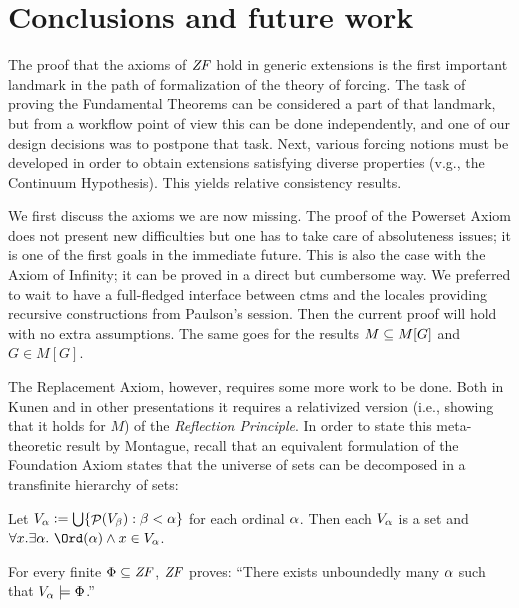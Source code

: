 \section{Conclusions and future work}
\label{sec:conclusions-future-work}

The proof that the axioms of $\mathit{ZF}$ hold in generic extensions is 
the first important landmark in the path of formalization of the
theory of forcing. The task of proving the Fundamental Theorems can be
considered a part of that landmark, but from a workflow point of view
this can be done independently, and one of our design decisions was to
postpone that task.  Next, various forcing notions must be developed
in order to obtain extensions satisfying diverse properties (v.g., the
Continuum Hypothesis). This yields relative consistency results.

We first discuss the axioms we are now missing. The proof of the
Powerset Axiom does not present new difficulties but one  has to
take care of absoluteness issues; it is one of the
first goals in the immediate future. This is also the case with the
Axiom of Infinity; it can be proved in a direct but cumbersome way. We
preferred to wait to have a full-fledged interface between ctms and the
locales providing recursive constructions from Paulson's
 session. Then the current proof will hold
with no extra assumptions. The same goes for the results $M\subseteq M[G]$
and $G\in M[G]$.

The Replacement Axiom, however, requires some more work to be
done. Both in Kunen and in other presentations \cite{neeman-course}
it requires a relativized version (i.e., showing that it holds for $M$) of
the \emph{Reflection Principle}. In order to state this meta-theoretic
result by Montague, recall that
an equivalent formulation of the Foundation Axiom states that the 
universe of sets can be decomposed in a transfinite hierarchy of
sets: 
\begin{theorem}
  Let $V_{\alpha}\mathrel{\mathop:}=\mathop{\textstyle\bigcup}\{\mathop{\mathcal{P}}(V_\beta) : \beta<\alpha\}$ for each ordinal
  $\alpha$. Then each $V_\alpha$ is a set and 
  $\forall x. \exists\al .\ \Ord(\al) \y x\in V_\al$.  
\end{theorem}
\begin{theorem}\label{th:reflection-principle}
  For every finite $\Phi\subseteq\mathit{ZF}$, $\mathit{ZF}$ proves: ``There exists
  unboundedly many $\alpha$ such that $V_\alpha\models \Phi$.''
\end{theorem}

